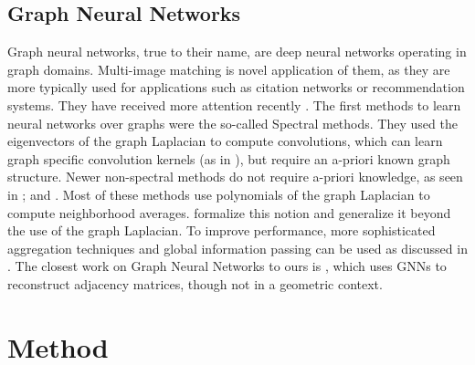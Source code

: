 \documentclass{article} %
\begin{document}
\subsection{Graph Neural Networks}
Graph neural networks, true to their name, are deep neural networks operating in graph domains.
Multi-image matching is novel application of them, as they are more typically used for applications such as citation networks or recommendation systems.
They have received more attention recently \citep{bronstein2017geometric, defferrard2016convolutional, kipf2017semi, scarselli2009graph, gama2018mimo, gama2018convolutional, battaglia2018relational}.
The first methods to learn neural networks over graphs were the so-called Spectral methods.
They used the eigenvectors of the graph Laplacian to compute convolutions, which can learn graph specific convolution kernels (as in \cite{bruna2013spectral}), but require an a-priori known graph structure. 
Newer non-spectral methods do not require a-priori knowledge, as seen in \cite{bronstein2017geometric, kipf2017semi, scarselli2009graph}; and \cite{gama2018convolutional}.
Most of these methods use polynomials of the graph Laplacian to compute neighborhood averages.
\cite{gama2018mimo, gama2018convolutional} formalize this notion and generalize it beyond the use of the graph Laplacian.
To improve performance, more sophisticated aggregation techniques and global information passing can be used as discussed in \cite{battaglia2018relational}.
The closest work on Graph Neural Networks to ours is \cite{kipf2016variational}, which uses GNNs to reconstruct adjacency matrices, though not in a geometric context.

\section{Method}
\end{document}
